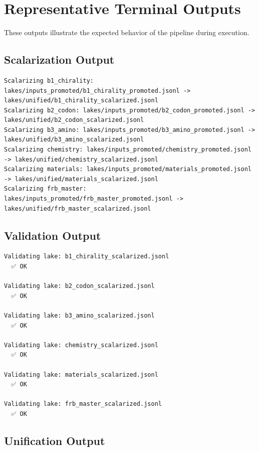 \documentclass[11pt, letterpaper, openany]{book}
\begin{document}
\section{Representative Terminal Outputs}

These outputs illustrate the expected behavior of the pipeline during execution.

\subsection{Scalarization Output}

\begin{lstlisting}[style=terminal]
Scalarizing b1_chirality: lakes/inputs_promoted/b1_chirality_promoted.jsonl -> lakes/unified/b1_chirality_scalarized.jsonl
Scalarizing b2_codon: lakes/inputs_promoted/b2_codon_promoted.jsonl -> lakes/unified/b2_codon_scalarized.jsonl
Scalarizing b3_amino: lakes/inputs_promoted/b3_amino_promoted.jsonl -> lakes/unified/b3_amino_scalarized.jsonl
Scalarizing chemistry: lakes/inputs_promoted/chemistry_promoted.jsonl -> lakes/unified/chemistry_scalarized.jsonl
Scalarizing materials: lakes/inputs_promoted/materials_promoted.jsonl -> lakes/unified/materials_scalarized.jsonl
Scalarizing frb_master: lakes/inputs_promoted/frb_master_promoted.jsonl -> lakes/unified/frb_master_scalarized.jsonl
\end{lstlisting}

\subsection{Validation Output}

\begin{lstlisting}[style=terminal]
Validating lake: b1_chirality_scalarized.jsonl
  ✅ OK

Validating lake: b2_codon_scalarized.jsonl
  ✅ OK

Validating lake: b3_amino_scalarized.jsonl
  ✅ OK

Validating lake: chemistry_scalarized.jsonl
  ✅ OK

Validating lake: materials_scalarized.jsonl
  ✅ OK

Validating lake: frb_master_scalarized.jsonl
  ✅ OK
\end{lstlisting}

\subsection{Unification Output}
\end{document}
